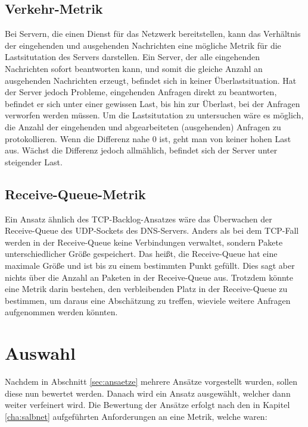\documentclass[a4paper, 12pt, BCOR10mm, DIV12, toc=bibliography, toc=listof, german]{scrbook}
\begin{document}
		\subsection*{Verkehr-Metrik} %

		Bei Servern, die einen Dienst für das Netzwerk bereitstellen, kann das Verhältnis der
		eingehenden und ausgehenden Nachrichten eine mögliche Metrik für die Lastsitutation des Servers
		darstellen.  Ein Server, der alle eingehenden Nachrichten sofort beantworten kann, und somit die
		gleiche Anzahl an ausgehenden Nachrichten erzeugt, befindet sich in keiner Überlastsituation.
		Hat der Server jedoch Probleme, eingehenden Anfragen direkt zu beantworten, befindet er sich
		unter einer gewissen Last, bis hin zur Überlast, bei der Anfragen verworfen werden müssen. Um
		die Lastsitutation zu untersuchen wäre es möglich, die Anzahl der eingehenden und abgearbeiteten
		(ausgehenden) Anfragen zu protokollieren. Wenn die Differenz nahe 0 ist, geht man von keiner
		hohen Last aus.  Wächst die Differenz jedoch allmählich, befindet sich der Server unter
		steigender Last.


		\subsection*{Receive-Queue-Metrik} %

		Ein Ansatz ähnlich des TCP-Backlog-Ansatzes \cite{zinke2007,scsczile2008} wäre das Überwachen
		der Receive-Queue des UDP-Sockets des DNS-Servers. Anders als bei dem TCP-Fall werden in
		der Receive-Queue keine Verbindungen verwaltet, sondern Pakete unterschiedlicher Größe
		gespeichert. Das heißt, die Receive-Queue hat eine maximale Größe und ist bis zu einem
		bestimmten Punkt gefüllt. Dies sagt aber nichts über die Anzahl an Paketen in der Receive-Queue
		aus.  Trotzdem könnte eine Metrik darin bestehen, den verbleibenden Platz in der Receive-Queue
		zu bestimmen, um daraus eine Abschätzung zu treffen, wieviele weitere Anfragen aufgenommen
		werden könnten.

		

		\section{Auswahl} %
		\label{sec:auswahl}

		Nachdem in Abschnitt \ref{sec:ansaetze} mehrere Ansätze vorgestellt wurden, sollen diese nun
		bewertet werden. Danach wird ein Ansatz ausgewählt, welcher dann weiter verfeinert wird. Die
		Bewertung der Ansätze erfolgt nach den in Kapitel \ref{cha:salbnet} aufgeführten Anforderungen
		an eine Metrik, welche waren:
\end{document}
